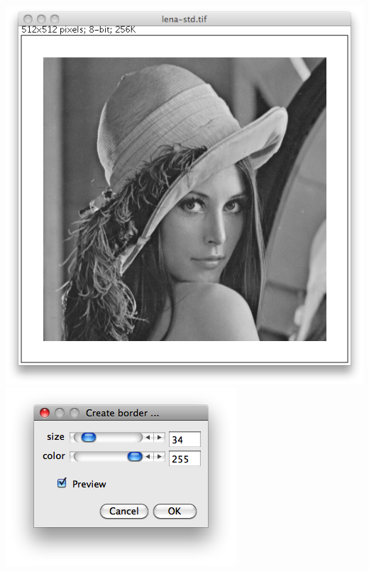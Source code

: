 \documentclass{book}
\begin{document}
\begin{center}
\includegraphics[scale=0.2]{lena-previewed.png}
\includegraphics[scale=0.4]{generic-dialog-with-preview.png}
\end{center}
\end{document}
